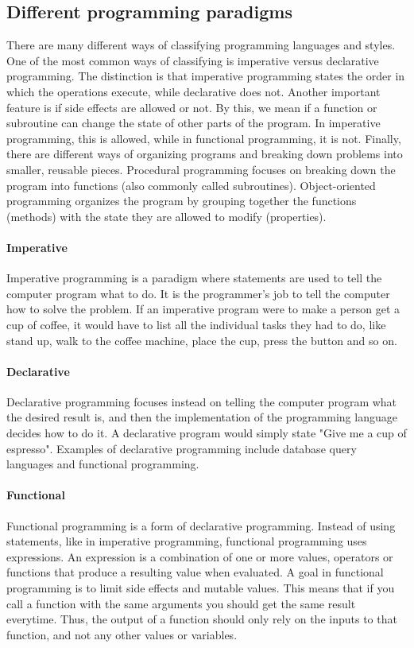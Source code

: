 \documentclass[12pt, a4paper]{article}
\begin{document}
\newpage

\subsection{Different programming paradigms}
There are many different ways of classifying programming languages and styles. One of the most common ways of classifying is imperative versus declarative programming. The distinction is that imperative programming states the order in which the operations execute, while declarative does not. Another important feature is if side effects are allowed or not. By this, we mean if a function or subroutine can change the state of other parts of the program. In imperative programming, this is allowed, while in functional programming, it is not. Finally, there are different ways of organizing programs and breaking down problems into smaller, reusable pieces. Procedural programming focuses on breaking down the program into functions (also commonly called subroutines). Object-oriented programming organizes the program by grouping together the functions (methods) with the state they are allowed to modify (properties).

\paragraph{Imperative} Imperative programming is a paradigm where statements are used to tell the computer program what to do. It is the programmer’s job to tell the computer how to solve the problem. If an imperative program were to make a person get a cup of coffee, it would have to list all the individual tasks they had to do, like stand up, walk to the coffee machine, place the cup, press the button and so on. 

\paragraph{Declarative} Declarative programming focuses instead on telling the computer program what the desired result is, and then the implementation of the programming language decides how to do it. A declarative program would simply state "Give me a cup of espresso". Examples of declarative programming include database query languages and functional programming.

\paragraph{Functional} Functional programming is a form of declarative programming. Instead of using statements, like in imperative programming, functional programming uses expressions. An expression is a combination of one or more values, operators or functions that produce a resulting value when evaluated. A goal in functional programming is to limit side effects and mutable values. This means that if you call a function with the same arguments you should get the same result everytime. Thus, the output of a function should only rely on the inputs to that function, and not any other values or variables.
\end{document}
